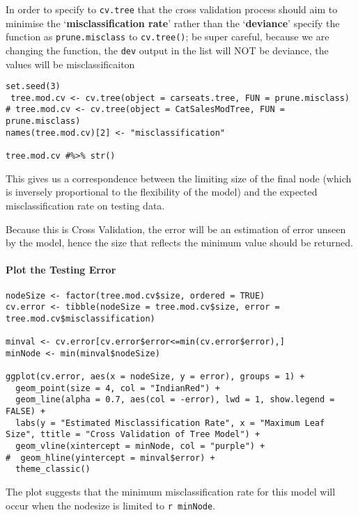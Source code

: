 \documentclass[12pt]{article}
\newcommand{\passthrough}[1]{#1}
\begin{document}
In order to specify to \passthrough{\lstinline!cv.tree!} that the cross
validation process should aim to minimise the `\textbf{misclassification
rate}' rather than the `\textbf{deviance}' specify the function as
\passthrough{\lstinline!prune.misclass!} to
\passthrough{\lstinline!cv.tree()!}; be super careful, because we are
changing the function, the \passthrough{\lstinline!dev!} output in the
list will NOT be deviance, the values will be misclassificaiton

\begin{lstlisting}
set.seed(3)
 tree.mod.cv <- cv.tree(object = carseats.tree, FUN = prune.misclass)
# tree.mod.cv <- cv.tree(object = CatSalesModTree, FUN = prune.misclass)
names(tree.mod.cv)[2] <- "misclassification"

tree.mod.cv #%>% str()

\end{lstlisting}

This gives us a correspondence between the limiting size of the final
node (which is inversely proportional to the flexibility of the model)
and the expected misclassification rate on testing data.

Because this is Cross Validation, the error will be an estimation of
error unseen by the model, hence the size that reflects the minimum
value should be returned.

\hypertarget{plot-the-testing-error}{%
\paragraph{Plot the Testing Error}\label{plot-the-testing-error}}

\begin{lstlisting}
nodeSize <- factor(tree.mod.cv$size, ordered = TRUE)
cv.error <- tibble(nodeSize = tree.mod.cv$size, error = tree.mod.cv$misclassification)

minval <- cv.error[cv.error$error<=min(cv.error$error),]
minNode <- min(minval$nodeSize)

ggplot(cv.error, aes(x = nodeSize, y = error), groups = 1) +
  geom_point(size = 4, col = "IndianRed") +
  geom_line(alpha = 0.7, aes(col = -error), lwd = 1, show.legend = FALSE) + 
  labs(y = "Estimated Misclassification Rate", x = "Maximum Leaf Size", ttitle = "Cross Validation of Tree Model") +
  geom_vline(xintercept = minNode, col = "purple") +
#  geom_hline(yintercept = minval$error) +
  theme_classic()
\end{lstlisting}

The plot suggests that the minimum misclassification rate for this model
will occur when the nodesize is limited to
\passthrough{\lstinline!r minNode!}.
\end{document}
